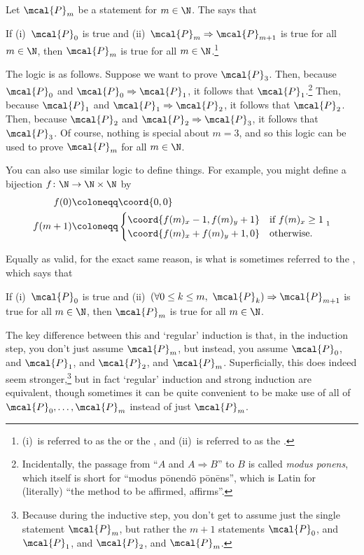 Let $\mcal{P}_m$ be a statement for $m\in \N$.  The  says that
\begin{displayquote}
If (i)~$\mcal{P}_0$ is true and (ii)~$\mcal{P}_m\Rightarrow \mcal{P}_{m+1}$ is true for all $m\in \N$, then $\mcal{P}_m$ is true for all $m\in \N$.\footnote{(i)~is referred to as the  or the , and (ii)~is referred to as the .}
\end{displayquote}
The logic is as follows.  Suppose we want to prove $\mcal{P}_3$.  Then, because $\mcal{P}_0$ and $\mcal{P}_0\Rightarrow \mcal{P}_1$, it follows that $\mcal{P}_1$.\footnote{Incidentally, the passage from ``$A$ and $A\Rightarrow B$'' to $B$ is called \emph{modus ponens}, which itself is short for ``modus pōnendō pōnēns'', which is Latin for (literally) ``the method to be affirmed, affirms''.}  Then, because $\mcal{P}_1$ and $\mcal{P}_1\Rightarrow \mcal{P}_2$, it follows that $\mcal{P}_2$.  Then, because $\mcal{P}_2$ and $\mcal{P}_2\Rightarrow \mcal{P}_3$, it follows that $\mcal{P}_3$.  Of course, nothing is special about $m=3$, and so this logic can be used to prove $\mcal{P}_m$ for all $m\in \N$.

You can also use similar logic to define things.  For example, you might define a bijection $f\colon \N \rightarrow \N \times \N$ by
\begin{equation}
\begin{split}
f(0) & \coloneqq \coord{0,0} \\
f(m+1) & \coloneqq \begin{cases}\coord{f(m)_x-1,f(m)_y+1} & \text{if }f(m)_x\geq 1 \\ \coord{f(m)_x+f(m)_y+1,0} & \text{otherwise.}\end{cases}\footnotemark
\end{split}
\end{equation}

Equally as valid, for the exact same reason, is what is sometimes referred to the , which says that
\begin{displayquote}
If (i)~$\mcal{P}_0$ is true and (ii)~$(\forall 0\leq k\leq m,\ \mcal{P}_k)\Rightarrow \mcal{P}_{m+1}$ is true for all $m\in \N$, then $\mcal{P}_m$ is true for all $m\in \N$.
\end{displayquote}
The key difference between this and `regular' induction is that, in the induction step, you don't just assume $\mcal{P}_m$, but instead, you assume $\mcal{P}_0$, and $\mcal{P}_1$, and $\mcal{P}_2$, and \textellipsis $\mcal{P}_m$.  Superficially, this does indeed seem stronger,\footnote{Because during the inductive step, you don't get to assume just the single statement $\mcal{P}_m$, but rather the $m+1$ statements $\mcal{P}_0$, and $\mcal{P}_1$, and $\mcal{P}_2$, and \textellipsis $\mcal{P}_m$.} but in fact `regular' induction and strong induction are equivalent, though sometimes it can be quite convenient to be make use of all of $\mcal{P}_0,\ldots ,\mcal{P}_m$ instead of just $\mcal{P}_m$.

